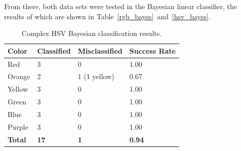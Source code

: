 \documentclass[twoside]{IEEEtran}
\begin{document}
From there, both data sets were tested in the Bayesian linear classifier, the results of which
are shown in Table~\ref{rgb_bayes}~and~\ref{hsv_bayes}.

\begin{table}[!t]
    \centering

    \caption{Complex HSV Bayesian classification results.}%
    \label{hsv_complex_bayes}
    \begin{tabular}{ l l l l }
        \toprule
        \bfseries Color & \bfseries Classified & \bfseries Misclassified & \bfseries Success Rate \\
        \midrule
        Red             & 3                    & 0                       & 1.00                   \\
        Orange          & 2                    & 1 (1 yellow)            & 0.67                   \\
        Yellow          & 3                    & 0                       & 1.00                   \\
        Green           & 3                    & 0                       & 1.00                   \\
        Blue            & 3                    & 0                       & 1.00                   \\
        Purple          & 3                    & 0                       & 1.00                   \\
        \midrule
        \bfseries Total & \bfseries 17         & \bfseries 1             & \bfseries 0.94         \\
        \bottomrule
    \end{tabular}
\end{table}
\end{document}
